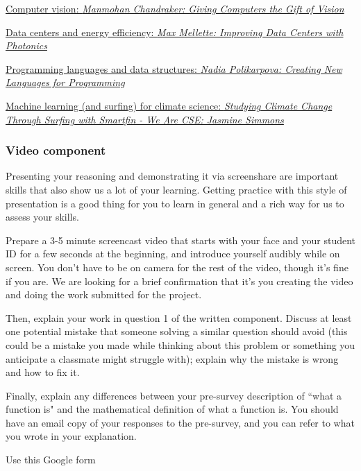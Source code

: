 \documentclass[12pt, oneside]{article}
\begin{document}
\begin{enumerate}
\href{https://www.uctv.tv/computer-science/search-details.aspx?showID=33421}{Computer vision: 
{\it Manmohan Chandraker: Giving Computers the Gift of Vision}}

\href{https://www.uctv.tv/computer-science/search-details.aspx?showID=33423}{Data centers and energy efficiency:
{\it  Max Mellette: Improving Data Centers with Photonics}}

\href{https://www.uctv.tv/computer-science/search-details.aspx?showID=33420}{Programming languages 
and data structures: {\it Nadia Polikarpova: Creating New Languages for Programming}}

\href{https://www.uctv.tv/computer-science/search-details.aspx?showID=34350}{Machine learning (and surfing) 
for climate science: {\it Studying Climate Change Through Surfing with Smartfin - We Are CSE: Jasmine Simmons}}
\end{enumerate}
\subsubsection*{Video component}
Presenting your reasoning and demonstrating it via screenshare are important 
skills that also show us a lot of your learning. Getting practice with this style of 
presentation is a good thing for you to learn in general and a rich way for us to assess your skills. 

Prepare a 3-5 minute screencast video that starts with 
your face and your student ID for a few seconds at the beginning, and introduce yourself audibly while on screen. 
You don't have to be on camera for the rest of the video, though it's fine if you are. 
We are looking for a brief confirmation that it's you creating the video and doing the work 
submitted for the project.

Then, explain your work in question 1 of the written component.
Discuss at least one potential mistake that someone solving 
a similar question should avoid (this could be a mistake you made while thinking about this 
problem or something you anticipate a classmate might struggle with); explain why the 
mistake is wrong and how to fix it.

Finally, explain any differences between your pre-survey description 
of ``what a function is" and the mathematical definition of what a function is. 
You should have an email copy of your responses to the pre-survey, 
and you can refer to what you wrote in your explanation.

Use this Google form
\end{document}
